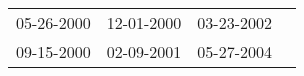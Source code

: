 \begin{supertabular}{llll}
 05-26-2000 &  12-01-2000 &  03-23-2002 \\
 09-15-2000 &  02-09-2001 &  05-27-2004 \\
\end{supertabular}
